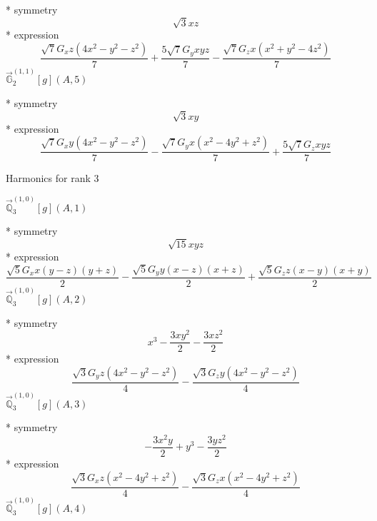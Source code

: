 \documentclass[fleqn,8pt]{jsarticle}
\begin{document}
\noindent\quad ** symmetry
\begin{dmath*}
\sqrt{3} x z
\end{dmath*}
\noindent\quad ** expression
\begin{dmath*}
\frac{\sqrt{7} G_{x} z \left(4 x^{2} - y^{2} - z^{2}\right)}{7} + \frac{5 \sqrt{7} G_{y} x y z}{7} - \frac{\sqrt{7} G_{z} x \left(x^{2} + y^{2} - 4 z^{2}\right)}{7}
\end{dmath*}
\noindent\quad $\vec{\mathbb{G}}_{2}^{(1,1)}[g](A,5)$

\noindent\quad ** symmetry
\begin{dmath*}
\sqrt{3} x y
\end{dmath*}
\noindent\quad ** expression
\begin{dmath*}
\frac{\sqrt{7} G_{x} y \left(4 x^{2} - y^{2} - z^{2}\right)}{7} - \frac{\sqrt{7} G_{y} x \left(x^{2} - 4 y^{2} + z^{2}\right)}{7} + \frac{5 \sqrt{7} G_{z} x y z}{7}
\end{dmath*}

\noindent * Harmonics for rank 3

\noindent\quad $\vec{\mathbb{Q}}_{3}^{(1,0)}[g](A,1)$

\noindent\quad ** symmetry
\begin{dmath*}
\sqrt{15} x y z
\end{dmath*}
\noindent\quad ** expression
\begin{dmath*}
\frac{\sqrt{5} G_{x} x \left(y - z\right) \left(y + z\right)}{2} - \frac{\sqrt{5} G_{y} y \left(x - z\right) \left(x + z\right)}{2} + \frac{\sqrt{5} G_{z} z \left(x - y\right) \left(x + y\right)}{2}
\end{dmath*}
\noindent\quad $\vec{\mathbb{Q}}_{3}^{(1,0)}[g](A,2)$

\noindent\quad ** symmetry
\begin{dmath*}
x^{3} - \frac{3 x y^{2}}{2} - \frac{3 x z^{2}}{2}
\end{dmath*}
\noindent\quad ** expression
\begin{dmath*}
\frac{\sqrt{3} G_{y} z \left(4 x^{2} - y^{2} - z^{2}\right)}{4} - \frac{\sqrt{3} G_{z} y \left(4 x^{2} - y^{2} - z^{2}\right)}{4}
\end{dmath*}
\noindent\quad $\vec{\mathbb{Q}}_{3}^{(1,0)}[g](A,3)$

\noindent\quad ** symmetry
\begin{dmath*}
- \frac{3 x^{2} y}{2} + y^{3} - \frac{3 y z^{2}}{2}
\end{dmath*}
\noindent\quad ** expression
\begin{dmath*}
\frac{\sqrt{3} G_{x} z \left(x^{2} - 4 y^{2} + z^{2}\right)}{4} - \frac{\sqrt{3} G_{z} x \left(x^{2} - 4 y^{2} + z^{2}\right)}{4}
\end{dmath*}
\noindent\quad $\vec{\mathbb{Q}}_{3}^{(1,0)}[g](A,4)$
\end{document}
